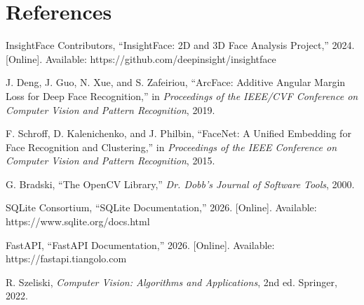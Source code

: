 \documentclass[12pt,a4paper]{report}
\newcommand{\JustifiedNormal}{\fontsize{12}{14}\selectfont\justifying\setlength{\parindent}{0pt}}
\begin{document}
\clearpage

\chapter*{References}
\vspace{2em}
\JustifiedNormal

\begin{enumerate}[label={[\arabic*]}, leftmargin=*]
  \item InsightFace Contributors, ``InsightFace: 2D and 3D Face Analysis Project,'' 2024. [Online]. Available: https://github.com/deepinsight/insightface
  \item J. Deng, J. Guo, N. Xue, and S. Zafeiriou, ``ArcFace: Additive Angular Margin Loss for Deep Face Recognition,'' in \textit{Proceedings of the IEEE/CVF Conference on Computer Vision and Pattern Recognition}, 2019.
  \item F. Schroff, D. Kalenichenko, and J. Philbin, ``FaceNet: A Unified Embedding for Face Recognition and Clustering,'' in \textit{Proceedings of the IEEE Conference on Computer Vision and Pattern Recognition}, 2015.
  \item G. Bradski, ``The OpenCV Library,'' \textit{Dr. Dobb's Journal of Software Tools}, 2000.
  \item SQLite Consortium, ``SQLite Documentation,'' 2026. [Online]. Available: https://www.sqlite.org/docs.html
  \item FastAPI, ``FastAPI Documentation,'' 2026. [Online]. Available: https://fastapi.tiangolo.com
  \item R. Szeliski, \textit{Computer Vision: Algorithms and Applications}, 2nd ed. Springer, 2022.
\end{enumerate}
\end{document}
